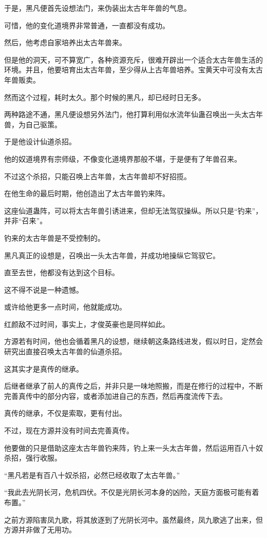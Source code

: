 \begin{this_body}
于是，黑凡便首先设想法门，来伪装出太古年年兽的气息。

可惜，他的变化道境界非常普通，一直都没有成功。

然后，他考虑自家培养出太古年兽来。

但是他的洞天，可不算宽广，各种资源充斥，很难开辟出一个适合太古年兽生活的环境。并且，他要培育出太古年兽，至少得从上古年兽培养。宝黄天中可没有太古年兽贩卖。

然而这个过程，耗时太久。那个时候的黑凡，却已经时日无多。

两种路途不通，黑凡便设想另外法门，他打算利用似水流年仙蛊召唤出一头太古年兽，为自己驱策。

于是他设计仙道杀招。

他的奴道境界有宗师级，不像变化道境界那般不堪，于是便有了年兽召来。

不过这个杀招，只能召唤上古年兽，太古年兽却不好招揽。

在他生命的最后时期，他创造出了太古年兽钓来阵。

这座仙道蛊阵，可以将太古年兽引诱进来，但却无法驾驭操纵。所以只是“钓来”，并非“召来”。

钓来的太古年兽是不受控制的。

黑凡真正的设想是，召唤出一头太古年兽，并成功地操纵它驾驭它。

直至去世，他都没有达到这个目标。

这不得不说是一种遗憾。

或许给他更多一点时间，他就能成功。

红颜敌不过时间，事实上，才俊英豪也是同样如此。

方源若有时间，他也会循着黑凡的设想，继续朝这条路线进发，假以时日，定然会研究出直接召唤太古年兽的仙道杀招。

这其实才是真传的继承。

后继者继承了前人的真传之后，并非只是一味地照搬，而是在修行的过程中，不断完善真传中的部分内容，或者添加进自己的东西，然后再度流传下去。

真传的继承，不仅是索取，更有付出。

不过，现在方源并没有时间去完善真传。

他要做的只是借助这座太古年兽钓来阵，钓上来一头太古年兽，然后运用百八十奴杀招，强行收服。

“黑凡若是有百八十奴杀招，必然已经收取了太古年兽。”

“我此去光阴长河，危机四伏。不仅是光阴长河本身的凶险，天庭方面极可能有着布置。”

之前方源陷害凤九歌，将其放逐到了光阴长河中。虽然最终，凤九歌逃了出来，但方源并非做了无用功。


\end{this_body}
